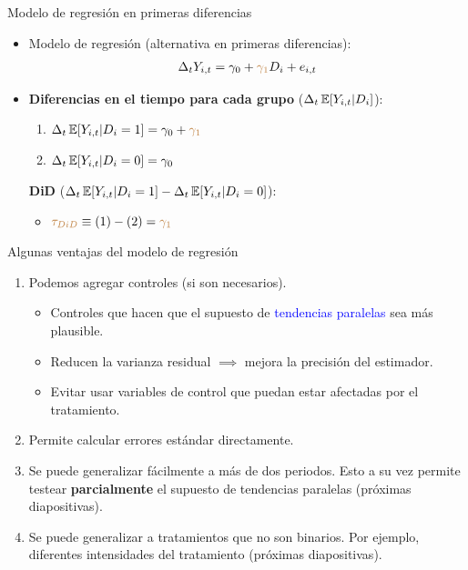 \documentclass[10pt, xcolor=dvipsnames]{beamer}
\begin{document}
\begin{frame}{Modelo de regresión en primeras diferencias}
\begin{itemize}\setlength{\itemsep}{1.0em}
	\item Modelo de regresión (alternativa en primeras diferencias):
	\begin{align*}
	\Delta_t Y_{i,t} = \gamma_0 + \textcolor{brown}{\gamma_1} D_i + e_{i,t}
	\end{align*} 
	\pause
	\item \textbf{Diferencias en el tiempo para cada grupo} ($\Delta_t \operatorname{\mathbb{E}}[Y_{i,t}|D_i]$):
	\begin{enumerate}
		\item[1.] $\Delta_t \operatorname{\mathbb{E}}[Y_{i,t}|D_i = 1] = \gamma_0 + \textcolor{brown}{\gamma_1}$ \\
		\item[2.] $\Delta_t \operatorname{\mathbb{E}}[Y_{i,t}|D_i = 0] = \gamma_0$ \\	
	\end{enumerate}
    \pause
	\vspace{0.2cm}
	\textbf{DiD} ($\Delta_t \operatorname{\mathbb{E}}[Y_{i,t}|D_i=1]-\Delta_t \operatorname{\mathbb{E}}[Y_{i,t}|D_i=0]$):
	\begin{itemize}
		\item $\textcolor{brown}{\tau_{DiD}} \equiv (1)-(2) = \textcolor{brown}{\gamma_1}$ \\
	\end{itemize}
\end{itemize}
\end{frame}


\begin{frame}{Algunas ventajas del modelo de regresión}
	\begin{enumerate}\setlength{\itemsep}{0.75em}
		\item Podemos agregar controles (si son necesarios). \smallspace
		\begin{itemize}\setlength{\itemsep}{0.35em}
			\item Controles que hacen que el supuesto de \textcolor{blue}{tendencias paralelas} sea más plausible. %
			\item Reducen la varianza residual $\implies$ mejora la precisión del estimador. %
			\item Evitar usar variables de control que puedan estar afectadas por el tratamiento.  
		\end{itemize} 	
		\item Permite calcular errores estándar directamente. \smallspace
		\item Se puede generalizar fácilmente a más de dos periodos. Esto a su vez permite testear \textbf{parcialmente} el supuesto de tendencias paralelas (próximas diapositivas). \smallspace
		\item Se puede generalizar a tratamientos que no son binarios. Por ejemplo, diferentes intensidades del tratamiento (próximas diapositivas).	
	\end{enumerate}
\end{frame}
\end{document}
